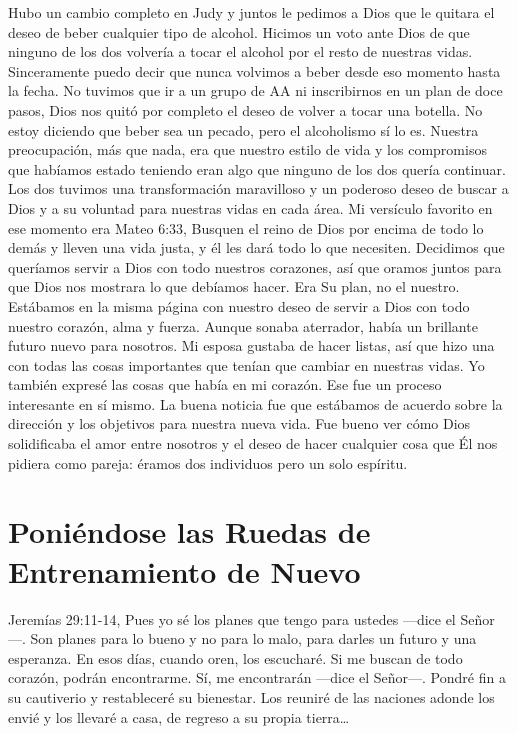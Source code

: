 \documentclass[twoside, 12pt]{book}
\begin{document}
Hubo un cambio completo en Judy y juntos le pedimos a Dios que le quitara el deseo de beber cualquier tipo de alcohol. Hicimos un voto ante Dios de que ninguno de los dos volvería a tocar el alcohol por el resto de nuestras vidas. Sinceramente puedo decir que nunca volvimos a beber desde eso momento hasta la fecha. No tuvimos que ir a un grupo de AA ni inscribirnos en un plan de doce pasos, Dios nos quitó por completo el deseo de volver a tocar una botella. No estoy diciendo que beber sea un pecado, pero el alcoholismo sí lo es. Nuestra preocupación, más que nada, era que nuestro estilo de vida y los compromisos que habíamos estado teniendo eran algo que ninguno de los dos quería continuar. Los dos tuvimos una transformación maravilloso y un poderoso deseo de buscar a Dios y a su voluntad para nuestras vidas en cada área.
Mi versículo favorito en ese momento era Mateo 6:33, Busquen el reino de Dios por encima de todo lo demás y lleven una vida justa, y él les dará todo lo que necesiten. Decidimos que queríamos servir a Dios con todo nuestros corazones, así que oramos juntos para que Dios nos mostrara lo que debíamos hacer. Era Su plan, no el nuestro. Estábamos en la misma página con nuestro deseo de servir a Dios con todo nuestro corazón, alma y fuerza. Aunque sonaba aterrador, había un brillante futuro nuevo para nosotros. Mi esposa gustaba de hacer listas, así que hizo una con todas las cosas importantes que tenían que cambiar en nuestras vidas. Yo también expresé las cosas que había en mi corazón. Ese fue un proceso interesante en sí mismo. La buena noticia fue que estábamos de acuerdo sobre la dirección y los objetivos para nuestra nueva vida. Fue bueno ver cómo Dios solidificaba el amor entre nosotros y el deseo de hacer cualquier cosa que Él nos pidiera como pareja: éramos dos individuos pero un solo espíritu.\\


\section{Poniéndose las Ruedas de Entrenamiento de Nuevo}

Jeremías 29:11-14, Pues yo sé los planes que tengo para ustedes —dice el Señor—. Son planes para lo bueno y no para lo malo, para darles un futuro y una esperanza. En esos días, cuando oren, los escucharé. Si me buscan de todo corazón, podrán encontrarme. Sí, me encontrarán —dice el Señor—. Pondré fin a su cautiverio y restableceré su bienestar. Los reuniré de las naciones adonde los envié y los llevaré a casa, de regreso a su propia tierra…       	        	
\end{document}
